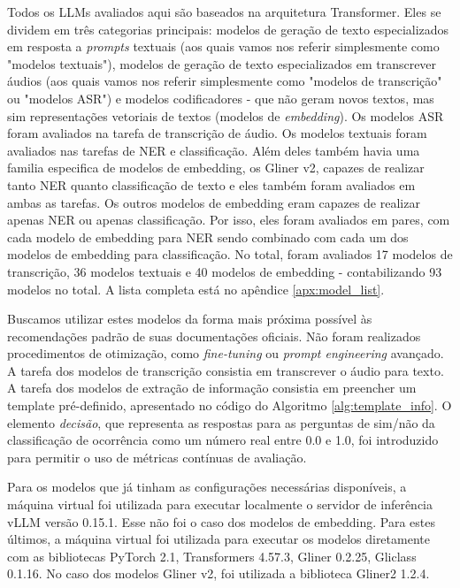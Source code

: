 \documentclass{IEEEphot}
\begin{document}
Todos os LLMs avaliados aqui são baseados na arquitetura Transformer. Eles se dividem em três categorias principais: modelos de geração de texto especializados em resposta a \textit{prompts} textuais (aos quais vamos nos referir simplesmente como "modelos textuais"), modelos de geração de texto especializados em transcrever áudios (aos quais vamos nos referir simplesmente como "modelos de transcrição" ou "modelos ASR") e modelos codificadores - que não geram novos textos, mas sim representações vetoriais de textos (modelos de \textit{embedding}). Os modelos ASR foram avaliados na tarefa de transcrição de áudio. Os modelos textuais foram avaliados nas tarefas de NER e classificação. Além deles também havia uma familia especifica de modelos de embedding, os Gliner v2, capazes de realizar tanto NER quanto classificação de texto e eles também foram avaliados em ambas as tarefas. Os outros modelos de embedding eram capazes de realizar apenas NER ou apenas classificação. Por isso, eles foram avaliados em pares, com cada modelo de embedding para NER sendo combinado com cada um dos modelos de embedding para classificação. No total, foram avaliados 17 modelos de transcrição, 36 modelos textuais e 40 modelos de embedding - contabilizando 93 modelos no total. A lista completa está no apêndice \ref{apx:model_list}.

Buscamos utilizar estes modelos da forma mais próxima possível às recomendações padrão de suas documentações oficiais. Não foram realizados procedimentos de otimização, como \textit{fine-tuning} ou \textit{prompt engineering} avançado. A tarefa dos modelos de transcrição consistia em transcrever o áudio para texto. A tarefa dos modelos de extração de informação consistia em preencher um template pré-definido, apresentado no código do Algoritmo \ref{alg:template_info}. O elemento \textit{decisão}, que representa as respostas para as perguntas de sim/não da classificação de ocorrência como um número real entre 0.0 e 1.0, foi introduzido para permitir o uso de métricas contínuas de avaliação.

Para os modelos que já tinham as configurações necessárias disponíveis, a máquina virtual foi utilizada para executar localmente o servidor de inferência vLLM versão 0.15.1. Esse não foi o caso dos modelos de embedding. Para estes últimos, a máquina virtual foi utilizada para executar os modelos diretamente com as bibliotecas PyTorch 2.1, Transformers 4.57.3, Gliner 0.2.25, Gliclass 0.1.16. No caso dos modelos Gliner v2, foi utilizada a biblioteca Gliner2 1.2.4.
\end{document}
